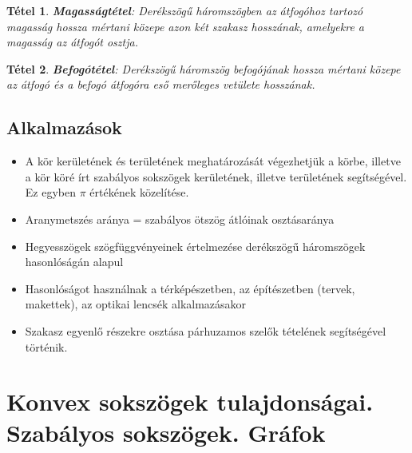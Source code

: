 \documentclass[12pt,a4paper]{article}
\newtheorem{theorem}{Tétel} [section]
\begin{document}
\begin{theorem}
\textbf{Magasságtétel}: Derékszögű háromszögben az átfogóhoz tartozó magasság hossza mértani közepe azon két szakasz hosszának, amelyekre a magasság az átfogót osztja.
\end{theorem}

\begin{theorem}
\textbf{Befogótétel}: Derékszögű háromszög befogójának hossza mértani közepe az átfogó és a befogó átfogóra eső merőleges vetülete hosszának.
\end{theorem}

\subsection{Alkalmazások}
\begin{itemize}
\item A kör kerületének és területének meghatározását végezhetjük a körbe, illetve a kör köré írt szabályos sokszögek kerületének, illetve területének segítségével. Ez egyben $\pi$ értékének közelítése.
\item Aranymetszés aránya = szabályos ötszög átlóinak osztásaránya
\item Hegyesszögek szögfüggvényeinek értelmezése derékszögű háromszögek hasonlóságán alapul
\item Hasonlóságot használnak a térképészetben, az építészetben (tervek, makettek), az optikai lencsék alkalmazásakor
\item  Szakasz egyenlő részekre osztása párhuzamos szelők tételének segítségével történik.
\end{itemize}
\newpage




\section{Konvex sokszögek tulajdonságai. Szabályos sokszögek. Gráfok}
\end{document}
